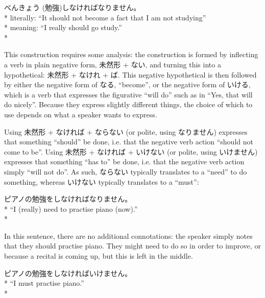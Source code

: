 \documentclass[11pt, b5paper, twoside, openright, onecolumn]{book}
\makeatletter
\newcommand*{\rubystack}[2]{{\relscale{0.5}%
  \begin{tabular}[b]{@{}c@{}}%
    {#1}\\%
   {\textscale{2}{#2}}%
  \end{tabular}}%
}
\DeclareRobustCommand*{\ruby}[2]{%
  \mbox{%
    \setlength{\parskip}{0ex}%
    \BeginAccSupp{method=pdfstringdef,ActualText={#1}}%
      \rubystack{\phantom{#2}}{#1}%
      \llap{%
        \rubystack{#2}{\phantom{#1}}%
      }%
    \EndAccSupp{}%
  }%
}
\renewcommand*{\ruby}[2]{#2 (#1)}%
\newenvironment{exampleblock}{
\setlength{\parindent}{0.6in}
\begin{minipage}[t]{\dimexpr\textwidth-\parindent}}
{\end{minipage}}
\makeatother
\begin{document}
\vspace{0.4cm}
\begin{exampleblock}
\ruby{勉強}{べんきょう}しなければなりません。 \\* 
literally: “It should not become a fact that I am not studying” \\* 
meaning: “I really should go study.” \\* 
\end{exampleblock}
\vspace{0.2cm}

This construction requires some analysis: the construction is formed by inflecting a verb in plain negative form‚ 未然形 + ない‚ and turning this into a hypothetical: 未然形 + なけれ + ば. This negative hypothetical is then followed by either the negative form of なる‚ “become”‚ or the negative form of いける‚ which is a verb that expresses the figurative “will do” such as in “Yes‚ that will do nicely”. Because they express slightly different things‚ the choice of which to use depends on what a speaker wants to express.

Using 未然形 + なければ + ならない (or polite‚ using なりません) expresses that something “should” be done‚ i.e. that the negative verb action “should not come to be”. Using 未然形 + なければ + いけない (or polite‚ using いけません) expresses that something “has to” be done‚ i.e. that the negative verb action simply “will not do”. As such‚ ならない typically translates to a “need” to do something‚ whereas いけない typically translates to a “must”:

\vspace{0.4cm}
\begin{exampleblock}
ピアノの勉強をしなければなりません。 \\* 
“I (really) need to practise piano (now).” \\* 
\end{exampleblock}
\vspace{0.2cm}

In this sentence‚ there are no additional connotations: the speaker simply notes that they should practise piano. They might need to do so in order to improve‚ or because a recital is coming up‚ but this is left in the middle.

\vspace{0.4cm}
\begin{exampleblock}
ピアノの勉強をしなければいけません。 \\* 
“I must practise piano.” \\* 
\end{exampleblock}
\vspace{0.2cm}
\end{document}
